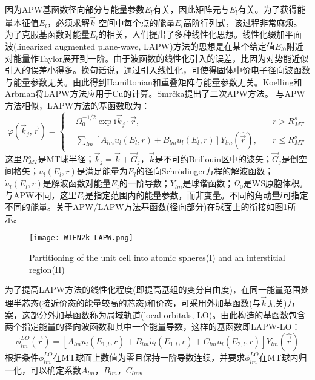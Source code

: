 因为APW基函数径向部分与能量参数$E_l$有关，因此矩阵元与$E_l$有关。为了获得能量本征值$E_l$，必须求解$\vec k$-空间中每个点的能量$E_l$高阶行列式，该过程非常麻烦。为了克服基函数对能量$E_l$的相关，人们提出了多种线性化思想\cite{PRB2-3098_1970,PRB2-290_1970,JPF9-661_1979,PRB19-6094_1979}。线性化缀加平面波(linearized augmented plane-wave, LAPW)方法的思想是在某个给定值$E_{l0}$附近对能量作Taylor展开到一阶\cite{PRB12-3060_1975}。由于波函数的线性化引入的误差，比因为对势能近似引入的误差小得多。换句话说，通过引入线性化，可使得固体中价电子径向波函数与能量参数无关。由此得到Hamiltonian和重叠矩阵与能量参数无关。Koelling和Arbman将LAPW方法应用于Cu的计算\cite{JPF5-2041_1975}。Smr\v cka提出了二次APW方法\cite{Smrcka}。
与APW方法相似，LAPW方法的基函数取为：
\begin{equation}
  \varphi(\vec k_j,\vec r)=\left\{
  \begin{aligned}
	  &\Omega_0^{-1/2}\exp{\mathrm{i}\vec k_j\cdot\vec r},&r>R_{MT}^s\\
    &\sum_{lm}[A_{lm}u_l(E_l,r)+B_{lm}\dot u_l(E_l,r)]Y_{lm}(\hat{\vec r}),\quad&r\leqslant R_{MT}^s
  \end{aligned}\right.
  \label{eq:LAPW-basis}
\end{equation}
这里$R_{MT}^s$是MT球半径；$\vec k_j=\vec k+\vec G_j$，$\vec k$是不可约Brillouin区中的波矢；$\vec G_j$是倒空间格矢；$u_l(E_l,r)$是满足能量为$E_l$的径向Schr\"odinger方程的解波函数；$\dot u_l(E_l,r)$是解波函数对能量$E_l$的一阶导数；$Y_{lm}$是球谐函数；$\Omega_0$是WS原胞体积。与APW不同，这里$E_l$是指定范围内的能量参数，而非变量。不同的角动量$l$可指定不同的能量。关于APW/LAPW方法基函数(径向部分)在球面上的衔接如图\ref{Muffin_tin}所示。
\begin{figure}[h!]
\centering
\texttt{[image: WIEN2k-LAPW.png]}
\caption{\small \textrm{Partitioning of the unit cell into atomic spheres(I) and an interstitial region(II)}}%
\label{Muffin_tin}
\end{figure}

为了提高LAPW方法的线性化程度(即提高基组的变分自由度)，在同一能量范围处理半芯态(接近价态的能量较高的芯态)和价态，可采用外加基函数(与$\vec k$无关)方案，这部分外加基函数称为局域轨道(local orbitals, LO)\cite{PRB43-6388_1991,Singh}。由此构造的基函数包含两个指定能量的径向波函数和其中一个能量导数，这样的基函数即LAPW-LO：
\begin{equation}
  \phi_{lm}^{LO}(\vec r)=[A_{lm}u_l(E_{1,l},r)+B_{lm}\dot u_l(E_{1,l},r)+C_{lm}u_l(E_{2,l},r)]Y_{lm}(\hat{\vec r})
  \label{eq:LAPW-LO}
\end{equation}
根据条件$\phi_{lm}^{LO}$在MT球面上数值为零且保持一阶导数连续，并要求$\phi_{lm}^{LO}$在MT球内归一化，可以确定系数$A_{lm}$，$B_{lm}$，$C_{lm}$。

